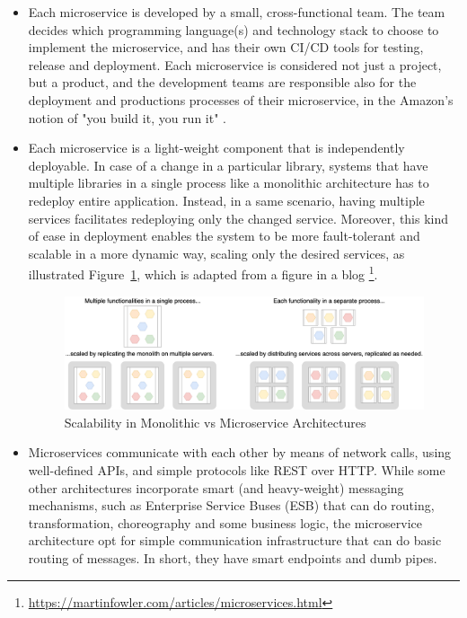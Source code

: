 \documentclass{Configuration_Files/PoliMi3i_thesis}
\begin{document}
\begin{itemize}
    \item Each microservice is developed by a small, cross-functional team.
    The team decides which programming language(s) and technology stack to choose to implement the microservice, and has their own CI/CD tools for testing, release and deployment.
    Each microservice is considered not just a project, but a product, and the development teams are responsible also for the deployment and productions processes of their microservice, in the Amazon's notion of "you build it, you run it" \cite{youbuild}.
    
    \item Each microservice is a light-weight component that is independently deployable. In case of a change in a particular library, systems that have multiple libraries in a single process like a monolithic architecture has to redeploy entire application. Instead, in a same scenario, having multiple services facilitates redeploying only the changed service. Moreover, this kind of ease in deployment enables the system to be more fault-tolerant and scalable in a more dynamic way, scaling only the desired services, as illustrated Figure~\ref{fig:scalability}, which is adapted from a figure in a blog \footnote{\href{https://martinfowler.com/articles/microservices.html}{https://martinfowler.com/articles/microservices.html}}.
    
    \begin{figure}[H]
    \centering
    \includegraphics[width=1\textwidth]{myImages/scalability.png}
    \caption{Scalability in Monolithic vs Microservice Architectures}
    \label{fig:scalability}
    \end{figure}

    \item Microservices communicate with each other by means of network calls, using well-defined APIs, and simple protocols like REST over HTTP. While some other architectures incorporate smart (and heavy-weight) messaging mechanisms, such as Enterprise Service Buses (ESB) that can do routing, transformation, choreography and some business logic, the microservice architecture opt for simple communication infrastructure that can do basic routing of messages. In short, they have smart endpoints and dumb pipes.
    

\end{itemize}
\end{document}
